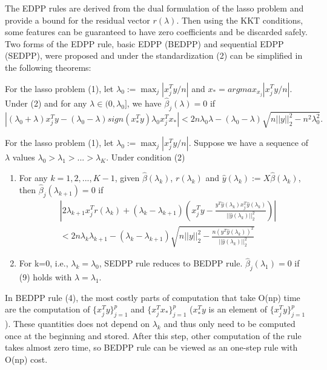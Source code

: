 The EDPP rules are derived from the dual formulation of the lasso problem and provide a bound for the residual vector $r(\lambda)$. Then using the KKT conditions, some features can be guaranteed to have zero coefficients and be discarded safely. Two forms of the EDPP rule, basic EDPP (BEDPP) and sequential EDPP (SEDPP)\citep{wang2013lasso}, were proposed and under the standardization (2) can be simplified in the following theorems\citep{Zeng2021}:

\begin{theorem}[BEDPP]
    For the lasso problem (1), let $\lambda_0:=\max_j|x_j^Ty/n|$ and $x_*=argmax_{x_j}|x_j^Ty/n|$. Under (2) and for any $\lambda\in(0,\lambda_0]$, we have $\hat{\beta}_j(\lambda)=0$ if
    \begin{equation}
        |(\lambda_0+\lambda)x_j^Ty-(\lambda_0-\lambda)sign(x_*^Ty)\lambda_0x_j^Tx_*|<2n\lambda_0\lambda-(\lambda_0-\lambda)\sqrt{n||y||_2^2-n^2\lambda_0^2}.
    \end{equation}
\end{theorem}

\begin{theorem}[SEDPP]
    For the lasso problem (1), let $\lambda_0:=\max_j|x_j^Ty/n|$. Suppose we have a sequence of $\lambda$ values $\lambda_0>\lambda_1>...>\lambda_K$. Under condition (2)
    \begin{enumerate}
        \item For any $k=1,2,...,K-1$, given $\hat{\beta}(\lambda_k)$, $r(\lambda_k)$ and $\hat{y}(\lambda_k):=X\hat{\beta}(\lambda_k)$, then $\hat{\beta}_j(\lambda_{k+1})=0$ if
        \begin{equation}
            \begin{split}
                &\left|2\lambda_{k+1}x_j^Tr(\lambda_k)+(\lambda_k-\lambda_{k+1})\left( x_j^Ty-\frac{y^T\hat{y}(\lambda_k)x_j^T\hat{y}(\lambda_k)}{||\hat{y}(\lambda_k)||_2^2}\right)\right|\\&<2n\lambda_k\lambda_{k+1}-(\lambda_k-\lambda_{k+1})\sqrt{n||y||_2^2-\frac{n(y^T\hat{y}(\lambda_k))^2}{||\hat{y}(\lambda_k)||_2^2}}
            \end{split}
        \end{equation}
        \item For k=0, i.e., $\lambda_k=\lambda_0$, SEDPP rule reduces to BEDPP rule. $\hat{\beta}_j(\lambda_1)=0$ if (9) holds with $\lambda=\lambda_1$.
    \end{enumerate}
\end{theorem}

In BEDPP rule (4), the most costly parts of computation that take O(np) time are the computation of $\{x_j^Ty\}_{j=1}^p$ and $\{x_j^Tx_*\}_{j=1}^p$ ($x_*^Ty$ is an element of $\{x_j^Ty\}_{j=1}^p$). These quantities does not depend on $\lambda_k$ and thus only need to be computed once at the beginning and stored. After this step, other computation of the rule takes almost zero time, so BEDPP rule can be viewed as an one-step rule with O(np) cost.

